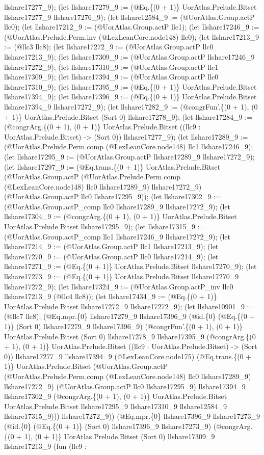 \documentclass[11pt]{article}
\begin{document}
llshare17277\_9); (let llshare17279\_9 := (@Eq.\{(0 + 1)\} UorAtlas.Prelude.Bitset llshare17277\_9 llshare17276\_9); (let llshare12584\_9 := (@UorAtlas.Group.actP llc0); (let llshare17212\_9 := (@UorAtlas.Group.actP llc1); (let llshare17246\_9 := (@UorAtlas.Prelude.Perm.inv (@LexLeanCore.node148) llc0); (let llshare17213\_9 := (@llc3 llc8); (let llshare17272\_9 := (@UorAtlas.Group.actP llc0 llshare17213\_9); (let llshare17309\_9 := (@UorAtlas.Group.actP llshare17246\_9 llshare17272\_9); (let llshare17310\_9 := (@UorAtlas.Group.actP llc1 llshare17309\_9); (let llshare17394\_9 := (@UorAtlas.Group.actP llc0 llshare17310\_9); (let llshare17395\_9 := (@Eq.\{(0 + 1)\} UorAtlas.Prelude.Bitset llshare17394\_9); (let llshare17396\_9 := (@Eq.\{(0 + 1)\} UorAtlas.Prelude.Bitset llshare17394\_9 llshare17272\_9); (let llshare17282\_9 := (@congrFun'.\{(0 + 1), (0 + 1)\} UorAtlas.Prelude.Bitset (Sort 0) llshare17278\_9); (let llshare17284\_9 := (@congrArg.\{(0 + 1), (0 + 1)\} UorAtlas.Prelude.Bitset ((llc9 : UorAtlas.Prelude.Bitset) -> (Sort 0)) llshare17277\_9); (let llshare17289\_9 := (@UorAtlas.Prelude.Perm.comp (@LexLeanCore.node148) llc1 llshare17246\_9); (let llshare17295\_9 := (@UorAtlas.Group.actP llshare17289\_9 llshare17272\_9); (let llshare17297\_9 := (@Eq.trans.\{(0 + 1)\} UorAtlas.Prelude.Bitset (@UorAtlas.Group.actP (@UorAtlas.Prelude.Perm.comp (@LexLeanCore.node148) llc0 llshare17289\_9) llshare17272\_9) (@UorAtlas.Group.actP llc0 llshare17295\_9)); (let llshare17302\_9 := (@UorAtlas.Group.actP\_comp llc0 llshare17289\_9 llshare17272\_9); (let llshare17304\_9 := (@congrArg.\{(0 + 1), (0 + 1)\} UorAtlas.Prelude.Bitset UorAtlas.Prelude.Bitset llshare17295\_9); (let llshare17315\_9 := (@UorAtlas.Group.actP\_comp llc1 llshare17246\_9 llshare17272\_9); (let llshare17214\_9 := (@UorAtlas.Group.actP llc1 llshare17213\_9); (let llshare17270\_9 := (@UorAtlas.Group.actP llc0 llshare17214\_9); (let llshare17271\_9 := (@Eq.\{(0 + 1)\} UorAtlas.Prelude.Bitset llshare17270\_9); (let llshare17273\_9 := (@Eq.\{(0 + 1)\} UorAtlas.Prelude.Bitset llshare17270\_9 llshare17272\_9); (let llshare17324\_9 := (@UorAtlas.Group.actP\_inv llc0 llshare17213\_9 (@llc4 llc8)); (let llshare17434\_9 := (@Eq.\{(0 + 1)\} UorAtlas.Prelude.Bitset llshare17272\_9 llshare17272\_9); (let llshare10901\_9 := (@llc7 llc8); (@Eq.mpr.\{0\} llshare17279\_9 llshare17396\_9 (@id.\{0\} (@Eq.\{(0 + 1)\} (Sort 0) llshare17279\_9 llshare17396\_9) (@congrFun'.\{(0 + 1), (0 + 1)\} UorAtlas.Prelude.Bitset (Sort 0) llshare17278\_9 llshare17395\_9 (@congrArg.\{(0 + 1), (0 + 1)\} UorAtlas.Prelude.Bitset ((llc9 : UorAtlas.Prelude.Bitset) -> (Sort 0)) llshare17277\_9 llshare17394\_9 (@LexLeanCore.node175) (@Eq.trans.\{(0 + 1)\} UorAtlas.Prelude.Bitset (@UorAtlas.Group.actP (@UorAtlas.Prelude.Perm.comp (@LexLeanCore.node148) llc0 llshare17289\_9) llshare17272\_9) (@UorAtlas.Group.actP llc0 llshare17295\_9) llshare17394\_9 llshare17302\_9 (@congrArg.\{(0 + 1), (0 + 1)\} UorAtlas.Prelude.Bitset UorAtlas.Prelude.Bitset llshare17295\_9 llshare17310\_9 llshare12584\_9 llshare17315\_9))) llshare17272\_9)) (@Eq.mpr.\{0\} llshare17396\_9 llshare17273\_9 (@id.\{0\} (@Eq.\{(0 + 1)\} (Sort 0) llshare17396\_9 llshare17273\_9) (@congrArg.\{(0 + 1), (0 + 1)\} UorAtlas.Prelude.Bitset (Sort 0) llshare17309\_9 llshare17213\_9 (fun (llc9 : 
\end{document}
